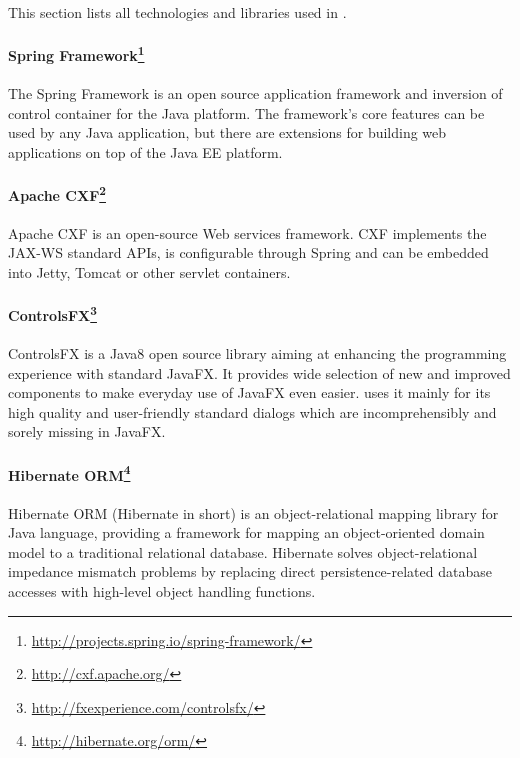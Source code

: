 
\label{sec:UsedTechnologies}

This section lists all technologies and libraries used in \textan{}.


\paragraph{Spring Framework\footnote{\url{http://projects.spring.io/spring-framework/}}}
The Spring Framework is an open source application framework and inversion
of control container for the Java platform. The framework's core features
can be used by any Java application, but there are extensions for building
web applications on top of the Java EE platform.

\paragraph{Apache CXF\footnote{\url{http://cxf.apache.org/}}}
Apache CXF is an open-source Web services framework. CXF implements the JAX-WS
standard APIs, is configurable through Spring and can be embedded into Jetty,
Tomcat or other servlet containers.

\paragraph{ControlsFX\footnote{\url{http://fxexperience.com/controlsfx/}}}
ControlsFX is a Java8 open source library aiming at enhancing the programming
experience with standard JavaFX. It provides wide selection of new and improved
components to make everyday use of JavaFX even easier. \textan{} uses it mainly
for its high quality and user-friendly standard dialogs which are
incomprehensibly and sorely missing in JavaFX.

\paragraph{Hibernate ORM\footnote{\url{http://hibernate.org/orm/}}}
Hibernate ORM (Hibernate in short) is an object-relational mapping library for
Java language, providing a framework for mapping an object-oriented domain
model to a traditional relational database. Hibernate solves object-relational
im\-pedance mismatch problems by replacing direct persistence-related database
accesses with high-level object handling functions.


